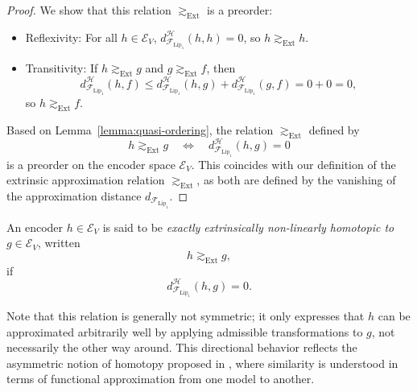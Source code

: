 \begin{proof}
We show that this relation $\gtrsim_{\mathrm{Ext}}$ is a preorder:
\begin{itemize}
    \item[]Reflexivity: For all \( h \in \mathcal{E}_V \), \( d_{\mathcal{F}_{\mathrm{Lip}_1}}^{\mathcal{H}}(h, h) = 0 \), so \( h \gtrsim_{\mathrm{Ext}} h \).
    \item[]Transitivity: If \( h \gtrsim_{\mathrm{Ext}} g \) and \( g \gtrsim_{\mathrm{Ext}} f \), then
    \[
    d_{\mathcal{F}_{\mathrm{Lip}_1}}^{\mathcal{H}}(h, f) \le d_{\mathcal{F}_{\mathrm{Lip}_1}}^{\mathcal{H}}(h, g) + d_{\mathcal{F}_{\mathrm{Lip}_1}}^{\mathcal{H}}(g, f) = 0 + 0 = 0,
    \]
    so \( h \gtrsim_{\mathrm{Ext}} f \).
\end{itemize}
Based on Lemma~\ref{lemma:quasi-ordering}, the relation \( \gtrsim_{\mathrm{Ext}} \) defined by
\[
h \gtrsim_{\mathrm{Ext}} g \quad \Longleftrightarrow \quad d_{\mathcal{F}_{\mathrm{Lip}_1}}^{\mathcal{H}}(h, g) = 0
\]
is a preorder on the encoder space \( \mathcal{E}_V \).  
This coincides with our definition of the extrinsic approximation relation \( \gtrsim_{\mathrm{Ext}} \),  
as both are defined by the vanishing of the approximation distance \( d_{\mathcal{F}_{\text{Lip}_1}} \).

\end{proof}


\begin{definition}
An encoder \( h \in \mathcal{E}_V \) is said to be \emph{exactly extrinsically non-linearly homotopic to} \( g \in \mathcal{E}_V \), written
\[
h \gtrsim_\text{Ext} g,
\]
if
\[
d_{\mathcal{F}_{\mathrm{Lip}_1}}^{\mathcal{H}}(h,g) = 0.
\]
\end{definition}

Note that this relation is generally not symmetric; it only expresses that \( h \) can be approximated arbitrarily well by applying admissible transformations to \( g \), not necessarily the other way around.
This directional behavior reflects the asymmetric notion of homotopy proposed in \cite{chan_affine_2024}, where similarity is understood in terms of functional approximation from one model to another.


